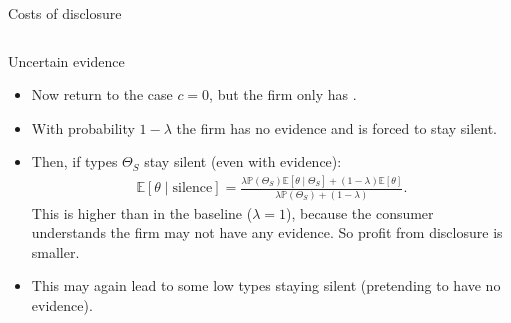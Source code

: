 \documentclass[english,10pt
,aspectratio=169
]{beamer}
\begin{document}
\begin{frame}{Costs of disclosure \citep{verrecchia_discretionary_1983}}
\begin{columns}
\begin{column}{0.4\linewidth}
	\end{column}
\end{columns}
\end{frame}


\begin{frame}{Uncertain evidence \citep{dye_disclosure_1985,jung_disclosure_1988}}
\begin{itemize}
	\item Now return to the case $c=0$, but the firm only has .
	\item With probability $1-\lambda$ the firm has no evidence and is forced to stay silent.
	\item Then, if types $\Theta_S$ stay silent (even with evidence):
	\begin{align*}
		\mathbb{E}[\theta \mid \text{silence}] = \frac{\lambda \mathbb{P}(\Theta_S) \mathbb{E}[\theta \mid \Theta_S] + (1-\lambda) \mathbb{E}[\theta]}{\lambda \mathbb{P}(\Theta_S) + (1-\lambda)}.
	\end{align*}
	This is higher than in the baseline ($\lambda=1$), because the consumer understands the firm may not have any evidence. So profit from disclosure is smaller.
	\item This may again lead to some low types staying silent (pretending to have no evidence).
\end{itemize}
\end{frame}
\end{document}
